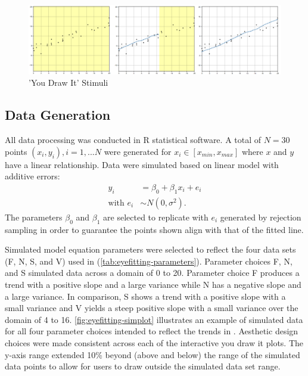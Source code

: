 \documentclass[12pt]{article}
\begin{document}
\begin{figure}[tbp]

{\centering \includegraphics[width=1\linewidth,]{images/ydi-stimuli} 

}

\caption{'You Draw It' Stimuli}\label{fig:ydi-stimuli}
\end{figure}

\hypertarget{data-generation}{%
\subsection{Data Generation}\label{data-generation}}

All data processing was conducted in R statistical software. A total of
\(N = 30\) points \((x_i, y_i), i = 1,...N\) were generated for
\(x_i \in [x_{min}, x_{max}]\) where \(x\) and \(y\) have a linear
relationship. Data were simulated based on linear model with additive
errors: \begin{align}
y_i & = \beta_0 + \beta_1 x_i + e_i \\
\text{with } e_i & \sim N(0, \sigma^2). \nonumber
\end{align} The parameters \(\beta_0\) and \(\beta_1\) are selected to
replicate \citet{mosteller1981eye} with \(e_i\) generated by rejection
sampling in order to guarantee the points shown align with that of the
fitted line.

Simulated model equation parameters were selected to reflect the four
data sets (F, N, S, and V) used in \citet{mosteller1981eye}
(\cref{tab:eyefitting-parameters}). Parameter choices F, N, and S
simulated data across a domain of 0 to 20. Parameter choice F produces a
trend with a positive slope and a large variance while N has a negative
slope and a large variance. In comparison, S shows a trend with a
positive slope with a small variance and V yields a steep positive slope
with a small variance over the domain of 4 to 16.
\cref{fig:eyefitting-simplot} illustrates an example of simulated data
for all four parameter choices intended to reflect the trends in
\citet{mosteller1981eye}. Aesthetic design choices were made consistent
across each of the interactive you draw it plots. The y-axis range
extended 10\% beyond (above and below) the range of the simulated data
points to allow for users to draw outside the simulated data set range.
\end{document}
